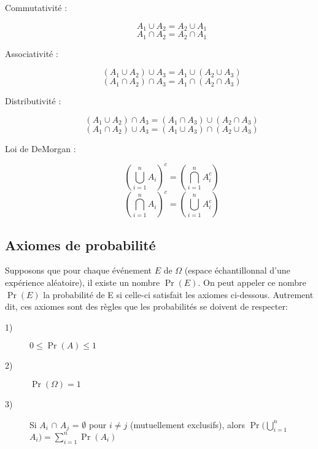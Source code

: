 \documentclass[10pt, french]{article}
\begin{document}
\begin{multicols*}{2}
\begin{definitionNOHFILLprop}
\begin{description}
  \item[Commutativité :] 
  $$A_1	\cup	A_2	=	A_2 \cup A_1$$ $$A_1	\cap	A_2	=	A_2 \cap A_1$$
  \item[Associativité :] $$(A_1 \cup A_2)	\cup A_3	=	A_1 \cup		(A_2 \cup A_3)$$ $$(A_1 \cap A_2)	\cap A_3	=	A_1 \cap		(A_2 \cap A_3)$$
  \item[Distributivité :] $$(A_1 \cup A_2)	\cap A_3 = (A_1 \cap A_3) \cup (A_2 \cap A_3)$$ $$(A_1 \cap A_2)	\cup A_3 = (A_1 \cup A_3) \cap (A_2 \cup A_3)$$
  \item[Loi de DeMorgan :] $$(\bigcup_{i = 1}^{n} A_{i})^{c} = (\bigcap_{i=1}^{n} A_i^{c})$$ $$(\bigcap_{i = 1}^{n} A_{i})^{c} = (\bigcup_{i=1}^{n} A_i^{c})$$
\end{description}
\end{definitionNOHFILLprop}
\vfill\null
\columnbreak

\subsection{Axiomes de probabilité}
\begin{definitionNOHFILLprop}
Supposons que pour chaque événement $E$ de $\Omega$ (espace échantillonnal d'une expérience aléatoire), il existe un nombre $\Pr(E)$. On peut appeler ce nombre $\Pr(E)$ la probabilité de E si celle-ci satisfait les axiomes ci-dessous. Autrement dit, ces axiomes sont des règles que les probabilités se doivent de respecter: 

\begin{description}
  \item[1)] $0 \leq \Pr(A) \leq 1$
  \item[2)] $\Pr(\Omega)=1$
  \item[3)] Si $A_i$ $\cap$ $A_j$ = $\emptyset$ pour $i \neq j$ (mutuellement exclusifs), alors $\Pr(\bigcup_{i = 1}^{n}$ $A_i) = \sum_{i = 1}^{n} \Pr(A_i)$
\end{description}
\end{definitionNOHFILLprop}

\begin{definitionNOHFILLprop}


\end{definitionNOHFILLprop}
\end{multicols*}
\end{document}
